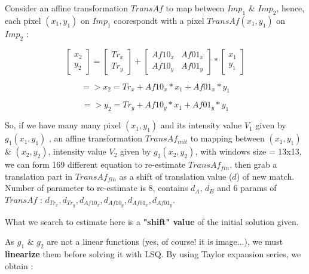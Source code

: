 \documentclass[twoside]{article}
\begin{document}
Consider an affine transformation $TransAf$ to map between $Imp_1$ \& $Imp_2$,    hence, each pixel $(x_1,y_1)$ on $Imp_1$ coorespondt with a pixel $TransAf(x_1,y_1)$ on $Imp_2$ : 

\begin{equation}
     \begin{bmatrix}
       x_2 \\
       y_2
     \end{bmatrix}
      = \begin{bmatrix}
        Tr_x \\ Tr_y
     \end{bmatrix}
     +
    \begin{bmatrix}
        Af10_x & Af01_x \\
        Af10_y & Af01_y
    \end{bmatrix}
    *
     \begin{bmatrix}
       x_1 \\
       y_1
     \end{bmatrix}
\end{equation}

\begin{equation}
=> x_2 = Tr_x + Af10_x*x_1 + Af01_x*y_1
\end{equation}

\begin{equation}
=> y_2 = Tr_y + Af10_y*x_1 + Af01_y*y_1
\end{equation}

So, if we have many many pixel $(x_1,y_1)$ and its intensity value $V_1$ given by $g_1(x_1,y_1)$ , an affine transformation $TransAf_{init}$ to mapping between 
$(x_1,y_1)$ \& $(x_2,y_2)$, intensity value $V_2$ given by $g_2(x_2,y_2)$, with windows size = 13x13, we can form 169 different equation to re-estimate $TransAf_{fin}$, then grab a translation part in $TransAf_{fin}$ as a shift of translation value ($d$) of new match. Number of parameter to re-estimate is 8, contains $d_A$, $d_B$ and 6 params of $TransAf$ : $d_{Tr_x}, d_{Tr_y}, d_{Af10_x}, d_{Af10_y}, d_{Af01_x}, d_{Af01_y}$.

What we search to estimate here is a \textbf{"shift" value }of the initial solution given.

As $g_1$ \& $g_2$ are not a linear functions (yes, of course! it is image...),  we must \textbf{linearize} them before solving it with LSQ. By using Taylor expansion series, we obtain : 
\end{document}
